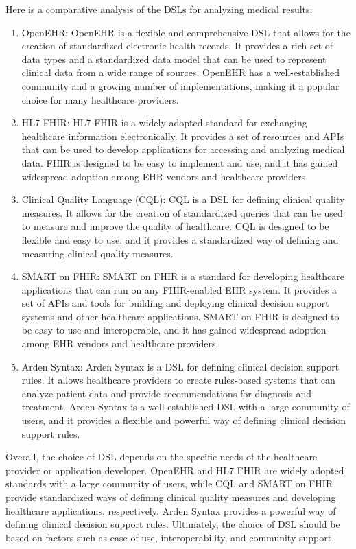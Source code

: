 Here is a comparative analysis of the DSLs for analyzing medical results:
\begin{enumerate}
\item OpenEHR: OpenEHR is a flexible and comprehensive DSL that allows for the creation of standardized electronic health records. It provides a rich set of data types and a standardized data model that can be used to represent clinical data from a wide range of sources. OpenEHR has a well-established community and a growing number of implementations, making it a popular choice for many healthcare providers.

\item HL7 FHIR: HL7 FHIR is a widely adopted standard for exchanging healthcare information electronically. It provides a set of resources and APIs that can be used to develop applications for accessing and analyzing medical data. FHIR is designed to be easy to implement and use, and it has gained widespread adoption among EHR vendors and healthcare providers.

\item Clinical Quality Language (CQL): CQL is a DSL for defining clinical quality measures. It allows for the creation of standardized queries that can be used to measure and improve the quality of healthcare. CQL is designed to be flexible and easy to use, and it provides a standardized way of defining and measuring clinical quality measures.

\item SMART on FHIR: SMART on FHIR is a standard for developing healthcare applications that can run on any FHIR-enabled EHR system. It provides a set of APIs and tools for building and deploying clinical decision support systems and other healthcare applications. SMART on FHIR is designed to be easy to use and interoperable, and it has gained widespread adoption among EHR vendors and healthcare providers.

\item Arden Syntax: Arden Syntax is a DSL for defining clinical decision support rules. It allows healthcare providers to create rules-based systems that can analyze patient data and provide recommendations for diagnosis and treatment. Arden Syntax is a well-established DSL with a large community of users, and it provides a flexible and powerful way of defining clinical decision support rules.
\end{enumerate}
Overall, the choice of DSL depends on the specific needs of the healthcare provider or application developer. OpenEHR and HL7 FHIR are widely adopted standards with a large community of users, while CQL and SMART on FHIR provide standardized ways of defining clinical quality measures and developing healthcare applications, respectively. Arden Syntax provides a powerful way of defining clinical decision support rules. Ultimately, the choice of DSL should be based on factors such as ease of use, interoperability, and community support.

